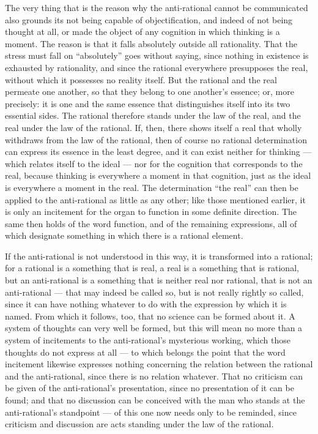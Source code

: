 \documentclass[12pt,a4paper]{book}
\newcommand{\opage}[1]{\marginnote{\footnotesize\textit{[#1]}}}
\begin{document}
The very thing that is the reason why the anti-rational cannot be communicated
also grounds its not being capable of objectification, and indeed of not being
thought
\opage{52}at all, or made the object of any cognition in which thinking is a
moment. The reason is that it falls absolutely outside all rationality. That
the stress must fall on ``absolutely'' goes without saying, since nothing in
existence is exhausted by rationality, and since the rational everywhere
presupposes the real, without which it possesses no reality itself. But the
rational and the real permeate one another, so that they belong to one
another's essence; or, more precisely: it is one and the same essence that
distinguishes itself into its two essential sides. The rational therefore
stands under the law of the real, and the real under the law of the rational.
If, then, there shows itself a real that wholly withdraws from the law of the
rational, then of course no rational determination can express its essence in
the least degree, and it can exist neither for thinking --- which relates
itself to the ideal --- nor for the cognition that corresponds to the real,
because thinking is everywhere a moment in that cognition, just as the ideal is
everywhere a moment in the real. The determination ``the real'' can then be
applied to the anti-rational as little as any other; like those mentioned
earlier, it is only an incitement for the organ to function in some definite
direction. The same then holds of the word function, and of the remaining
expressions, all of which designate something in which there is a rational
element.

If the anti-rational is not understood in this way, it is transformed into a
rational; for a rational is a something that is real, a real is a something
that is
\opage{53}rational, but an anti-rational is a something that is neither real
nor rational, that is not an anti-rational --- that may indeed be called so,
but is not really rightly so called, since it can have nothing whatever to do
with the expression by which it is named. From which it follows, too, that no
science can be formed about it. A system of thoughts can very well be formed,
but this will mean no more than a system of incitements to the anti-rational's
mysterious working, which those thoughts do not express at all --- to which
belongs the point that the word incitement likewise expresses nothing
concerning the relation between the rational and the anti-rational, since there
is no relation whatever. That no criticism can be given of the anti-rational's
presentation, since no presentation of it can be found; and that no discussion
can be conceived with the man who stands at the anti-rational's standpoint ---
of this one now needs only to be reminded, since criticism and discussion are
acts standing under the law of the rational.
\end{document}
